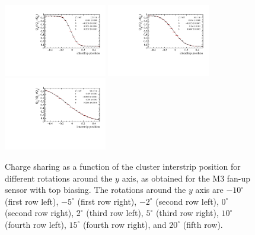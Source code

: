 \begin{figure}[]
\includegraphics[width=0.4\textwidth]{figs/ChargeSharingvsAngle/cchargeSharing_M3_FanUp_Top_10.pdf}
\includegraphics[width=0.4\textwidth]{figs/ChargeSharingvsAngle/cchargeSharing_M3_FanUp_Top_15.pdf}
\includegraphics[width=0.4\textwidth]{figs/ChargeSharingvsAngle/cchargeSharing_M3_FanUp_Top_20.pdf}
\caption[Charge sharing as a function of the cluster interstrip position for different rotations around the $y$ axis.]{Charge sharing as a function of the cluster interstrip position for different rotations around the $y$ axis, as obtained for the M3 fan-up sensor with top biasing. The rotations around the $y$ axis are $-10^\circ$ (first row left), $-5^\circ$ (first row right), $-2^\circ$ (second row left), $0^\circ$ (second row right), $2^\circ$ (third row left), $5^\circ$ (third row right), $10^\circ$ (fourth row left), $15^\circ$ (fourth row right), and $20^\circ$ (fifth row).}
\label{fig:ChargeSharingvsAngle}
\end{figure}


